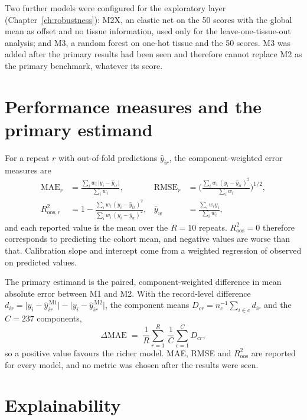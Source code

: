 Two further models were configured for the exploratory layer
(Chapter~\ref{ch:robustness}): M2X, an elastic net on the 50 scores with the global mean as
offset and no tissue information, used only for the leave-one-tissue-out analysis; and M3,
a random forest on one-hot tissue and the 50 scores. M3 was added after the primary results
had been seen and therefore cannot replace M2 as the primary benchmark, whatever its score.

\section{Performance measures and the primary estimand}\label{sec:metrics}

For a repeat $r$ with out-of-fold predictions $\hat{y}_{ir}$, the component-weighted error
measures are
\begin{align}
  \mathrm{MAE}_r &= \frac{\sum_i w_i\,\lvert y_i-\hat{y}_{ir}\rvert}{\sum_i w_i}, &
  \mathrm{RMSE}_r &= \Biggl(\frac{\sum_i w_i\,(y_i-\hat{y}_{ir})^2}{\sum_i w_i}\Biggr)^{1/2},
  \label{eq:mae}\\
  R^2_{\mathrm{oos},r} &= 1-\frac{\sum_i w_i\,(y_i-\hat{y}_{ir})^2}
                                  {\sum_i w_i\,(y_i-\bar{y}_w)^2}, &
  \bar{y}_w &= \frac{\sum_i w_i y_i}{\sum_i w_i},
  \label{eq:r2}
\end{align}
and each reported value is the mean over the $R=10$ repeats. $R^2_{\mathrm{oos}}=0$
therefore corresponds to predicting the cohort mean, and negative values are worse than
that. Calibration slope and intercept come from a weighted regression of observed on
predicted values.

The primary estimand is the paired, component-weighted difference in mean absolute error
between M1 and M2. With the record-level difference
$d_{ir}=\lvert y_i-\hat{y}^{\,\mathrm{M1}}_{ir}\rvert-\lvert y_i-\hat{y}^{\,\mathrm{M2}}_{ir}\rvert$,
the component means $D_{cr}=n_c^{-1}\sum_{i\in c} d_{ir}$ and the $C=237$ components,
\begin{equation}
  \Delta\mathrm{MAE} \;=\; \frac{1}{R}\sum_{r=1}^{R}\,\frac{1}{C}\sum_{c=1}^{C} D_{cr},
  \label{eq:dmae}
\end{equation}
so a positive value favours the richer model. MAE, RMSE and $R^2_{\mathrm{oos}}$ are
reported for every model, and no metric was chosen after the results were seen.

\section{Explainability}\label{sec:explain-methods}

